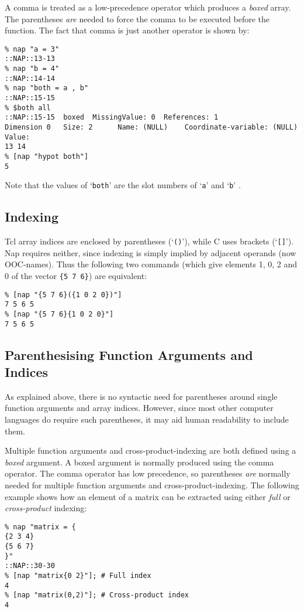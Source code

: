     

A comma is treated as a low-precedence operator which produces a
    \emph{boxed} array. The parentheses 
    \emph{are} needed to force the comma to be executed before the
    function. The fact that comma is just another operator is shown
    by:
\begin{verbatim}
% nap "a = 3"
::NAP::13-13
% nap "b = 4"
::NAP::14-14
% nap "both = a , b"
::NAP::15-15
% $both all
::NAP::15-15  boxed  MissingValue: 0  References: 1
Dimension 0   Size: 2      Name: (NULL)    Coordinate-variable: (NULL)
Value:
13 14
% [nap "hypot both"]
5
\end{verbatim}
Note that the values of `\texttt{both}' are the slot numbers of `\texttt{a}' and `\texttt{b}' .

\subsection{Indexing}
      \label{syntax-Indexing}

Tcl array indices are enclosed by parentheses (`\texttt{()}'), while C uses brackets (`\texttt{[]}'). Nap requires neither, since indexing is
    simply implied by adjacent operands (now OOC-names). Thus the
    following two commands (which give elements 1, 0, 2 and 0 of the
    vector 
    \texttt{\{5 7 6\}}) are equivalent:
    \begin{verbatim}
% [nap "{5 7 6}({1 0 2 0})"]
7 5 6 5
% [nap "{5 7 6}{1 0 2 0}"]
7 5 6 5
\end{verbatim}

\subsection{Parenthesising Function Arguments and Indices}
      \label{syntax-Parenthesising}

As explained above, there is no syntactic need for parentheses
    around single function arguments and array indices. However, since
    most other computer languages do require such parentheses, it may
    aid human readability to include them.
    

Multiple function arguments and cross-product-indexing are both
    defined using a 
    \emph{boxed} argument. A boxed argument is normally produced
    using the comma operator. The comma operator has low precedence, so
    parentheses 
    \emph{are} normally needed for multiple function arguments and
    cross-product-indexing. The following example shows how an element
    of a matrix can be extracted using either 
    \emph{full} or 
    \emph{cross-product} indexing:
    \begin{verbatim}
% nap "matrix = {
{2 3 4}
{5 6 7}
}"
::NAP::30-30
% [nap "matrix{0 2}"]; # Full index
4
% [nap "matrix(0,2)"]; # Cross-product index
4
\end{verbatim}

